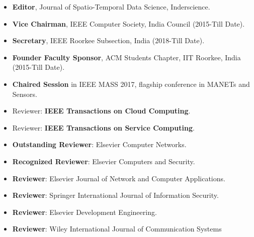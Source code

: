 \begin{itemize}
	\item \textbf{Editor}, Journal of Spatio-Temporal Data Science, Inderscience.

	\item \textbf{Vice Chairman}, IEEE Computer Society, India Council (2015-Till Date).

		\item \textbf{Secretary}, IEEE Roorkee Subsection, India (2018-Till Date).

	\item \textbf{Founder Faculty Sponsor}, ACM Students Chapter, IIT Roorkee, India (2015-Till Date).
	
	\item \textbf{Chaired Session} in IEEE MASS 2017, flagship conference in MANETs and Sensors.
		
	\item Reviewer: \textbf{IEEE Transactions on Cloud Computing}.
	
	\item Reviewer: \textbf{IEEE Transactions on Service Computing}.
	
	\item \textbf{ Outstanding Reviewer}: Elsevier Computer Networks.

	\item \textbf{Recognized Reviewer}: Elsevier Computers and Security.

	\item \textbf{Reviewer}: Elsevier Journal of Network and Computer Applications.
	
	\item \textbf{Reviewer}: Springer International Journal of Information Security.
	
	\item \textbf{Reviewer}: Elsevier Development Engineering. 
	
		\item \textbf{Reviewer}: Wiley International Journal of Communication Systems

	\end{itemize}
	
